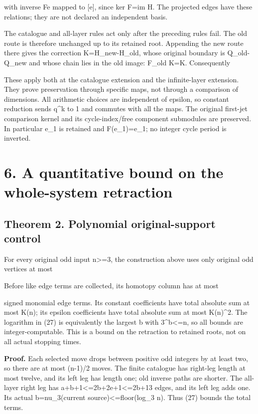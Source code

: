 with inverse Fe mapped to {[}e{]}, since ker F=im H. The projected edges
have these relations; they are not declared an independent basis.

The catalogue and all-layer rules act only after the preceding rules
fail. The old route is therefore unchanged up to its retained root.
Appending the new route there gives the correction K=H\_new-H\_old,
whose original boundary is Q\_old-Q\_new and whose chain lies in the old
image: F\_old K=K. Consequently


These apply both at the catalogue extension and the infinite-layer
extension. They prove preservation through specific maps, not through a
comparison of dimensions. All arithmetic choices are independent of
epsilon, so constant reduction sends q\^{}k to 1 and commutes with all
the maps. The original first-jet comparison kernel and its
cycle-index/free component submodules are preserved. In particular e\_1
is retained and F(e\_1)=e\_1; no integer cycle period is inverted.

\section{6. A quantitative bound on the whole-system retraction}

\subsection{Theorem 2. Polynomial original-support control}

For every original odd input n\textgreater=3, the construction above
uses only original odd vertices at most


Before like edge terms are collected, its homotopy column has at most


signed monomial edge terms. Its constant coefficients have total
absolute sum at most K(n); its epsilon coefficients have total absolute
sum at most K(n)\^{}2. The logarithm in (27) is equivalently the largest
b with 3\^{}b\textless=n, so all bounds are integer-computable. This is
a bound on the retraction to retained roots, not on all actual stopping
times.

\textbf{Proof.} Each selected move drops between positive odd integers
by at least two, so there are at most (n-1)/2 moves. The finite
catalogue has right-leg length at most twelve, and its left leg has
length one; old inverse paths are shorter. The all-layer right leg has
a+b+1\textless=2b+2e+1\textless=2b+13 edges, and its left leg adds one.
Its actual b=nu\_3(current source)\textless=floor(log\_3 n). Thus (27)
bounds the total terms.

